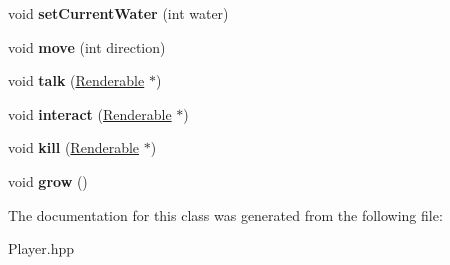 \begin{DoxyCompactItemize}
void {\bfseries set\+Current\+Water} (int water)
\item 
\mbox{\label{class_player_a8e6ae2e7828c05c2125ab0c573b55d83}} 
void {\bfseries move} (int direction)
\item 
\mbox{\label{class_player_a72c0adada0d16555ec66923a8f7a9883}} 
void {\bfseries talk} (\mbox{\hyperlink{class_renderable}{Renderable}} $\ast$)
\item 
\mbox{\label{class_player_a230fac341c65750c25adcf4060495a8d}} 
void {\bfseries interact} (\mbox{\hyperlink{class_renderable}{Renderable}} $\ast$)
\item 
\mbox{\label{class_player_a7436fd0bdfd9e4642efac1b33a0052d9}} 
void {\bfseries kill} (\mbox{\hyperlink{class_renderable}{Renderable}} $\ast$)
\item 
\mbox{\label{class_player_a88055637b6065fc4294ad555ebb3071b}} 
void {\bfseries grow} ()
\end{DoxyCompactItemize}


The documentation for this class was generated from the following file\+:\begin{DoxyCompactItemize}
\item 
Player.\+hpp\end{DoxyCompactItemize}
